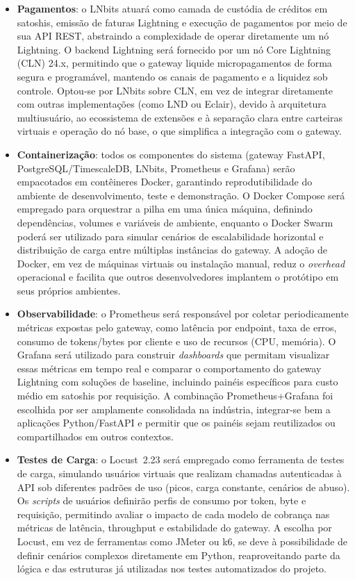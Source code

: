 \documentclass[openright]{normas-utf-tex}
\begin{document}
\begin{itemize}
    \item \textbf{Pagamentos}: o LNbits atuará como camada de custódia de créditos em satoshis, emissão de faturas Lightning e execução de pagamentos por meio de sua API REST, abstraindo a complexidade de operar diretamente um nó Lightning. O backend Lightning será fornecido por um nó Core Lightning (CLN) 24.x, permitindo que o gateway liquide micropagamentos de forma segura e programável, mantendo os canais de pagamento e a liquidez sob controle. Optou-se por LNbits sobre CLN, em vez de integrar diretamente com outras implementações (como LND ou Eclair), devido à arquitetura multiusuário, ao ecossistema de extensões e à separação clara entre carteiras virtuais e operação do nó base, o que simplifica a integração com o gateway.

    \item \textbf{Containerização}: todos os componentes do sistema (gateway FastAPI, PostgreSQL/TimescaleDB, LNbits, Prometheus e Grafana) serão empacotados em contêineres Docker, garantindo reprodutibilidade do ambiente de desenvolvimento, teste e demonstração. O Docker Compose será empregado para orquestrar a pilha em uma única máquina, definindo dependências, volumes e variáveis de ambiente, enquanto o Docker Swarm poderá ser utilizado para simular cenários de escalabilidade horizontal e distribuição de carga entre múltiplas instâncias do gateway. A adoção de Docker, em vez de máquinas virtuais ou instalação manual, reduz o \textit{overhead} operacional e facilita que outros desenvolvedores implantem o protótipo em seus próprios ambientes.

    \item \textbf{Observabilidade}: o Prometheus será responsável por coletar periodicamente métricas expostas pelo gateway, como latência por endpoint, taxa de erros, consumo de tokens/bytes por cliente e uso de recursos (CPU, memória). O Grafana será utilizado para construir \textit{dashboards} que permitam visualizar essas métricas em tempo real e comparar o comportamento do gateway Lightning com soluções de baseline, incluindo painéis específicos para custo médio em satoshis por requisição. A combinação Prometheus+Grafana foi escolhida por ser amplamente consolidada na indústria, integrar-se bem a aplicações Python/FastAPI e permitir que os painéis sejam reutilizados ou compartilhados em outros contextos.

    \item \textbf{Testes de Carga}: o Locust~2.23 será empregado como ferramenta de testes de carga, simulando usuários virtuais que realizam chamadas autenticadas à API sob diferentes padrões de uso (picos, carga constante, cenários de abuso). Os \textit{scripts} de usuários definirão perfis de consumo por token, byte e requisição, permitindo avaliar o impacto de cada modelo de cobrança nas métricas de latência, throughput e estabilidade do gateway. A escolha por Locust, em vez de ferramentas como JMeter ou k6, se deve à possibilidade de definir cenários complexos diretamente em Python, reaproveitando parte da lógica e das estruturas já utilizadas nos testes automatizados do projeto.


\end{itemize}
\end{document}
